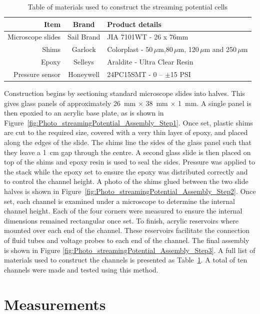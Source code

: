       \begin{table}
        \begin{tabular}{r|c|l}
          Item & Brand & Product details\tabularnewline\hline
          Microscope slides & Sail Brand & JIA 7101WT - 26 x 76mm\tabularnewline
          Shims & Garlock & Colorplast - 50$\,\mu$m,80$\,\mu$m, 120$\,\mu$m and 250$\,\mu$m\tabularnewline
          Epoxy & Selleys & Araldite - Ultra Clear Resin\tabularnewline
          Pressure sensor & Honeywell & 24PC15SMT - 0 -- $\pm$15 PSI\tabularnewline
        \end{tabular}
        \caption{\label{Table_StreamingCell_MaterialsUsed}Table of materials used to construct the streaming potential cells}
      \end{table}
      Construction begins by sectioning standard microscope slides into halves.
      This gives glass panels of approximately \SI{26}{\milli\meter} $\times$ \SI{38}{\milli\meter} $\times$ \SI{1}{\milli\meter}.
      A single panel is then epoxied to an acrylic base plate, as is shown in Figure~\ref{fig:Photo_streamingPotential_Assembly_Step1}.
      Once set, plastic shims are cut to the required size, covered with a very thin layer of epoxy, and placed along the edges of the slide.
      The shims line the sides of the glass panel such that they leave a \SI{1}{\centi\meter} gap through the centre.
      A second glass slide is then placed on top of the shims and epoxy resin is used to seal the sides.
      Pressure was applied to the stack while the epoxy set to ensure the epoxy was distributed correctly and to control the channel height.
      A photo of the shims glued between the two slide halves is shown in Figure~\ref{fig:Photo_streamingPotential_Assembly_Step2}.
      Once set, each channel is examined under a microscope to determine the internal channel height.
      Each of the four corners were measured to ensure the internal dimensions remained rectangular once set.
      To finish, acrylic reservoirs where mounted over each end of the channel.
      These reservoirs facilitate the connection of fluid tubes and voltage probes to each end of the channel.
      The final assembly is shown in Figure \ref{fig:Photo_streamingPotential_Assembly_Step3}.
      A full list of materials used to construct the channels is presented as Table~\ref{Table_StreamingCell_MaterialsUsed}.
      A total of ten channels were made and tested using this method.


\section{Measurements}
  \label{sect:part1_energyHarvesting_measuringStreamingCells}


